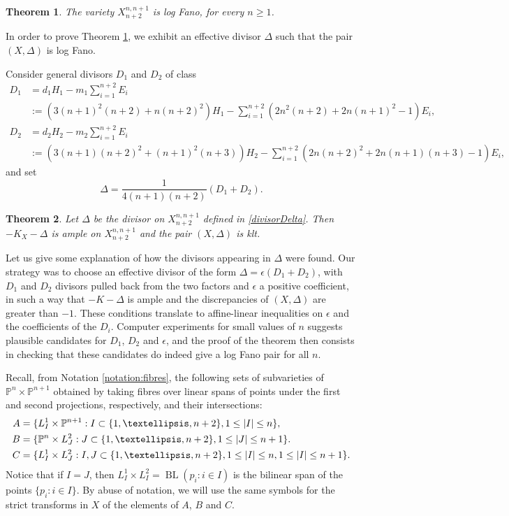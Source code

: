 \documentclass[a4paper,11pt]{article}
\newtheorem{theorem}{Theorem}[section]
\newcommand{\PP}{\mathbb P}
\newcommand{\BL}{\operatorname{BL}}
\begin{document}
\begin{theorem}\label{theoremXn,n+1,n+2-logFano}
The variety $X^{n,n+1}_{n+2}$ is log Fano, for every $n\ge1$.
\end{theorem}
 In order to prove Theorem \ref{theoremXn,n+1,n+2-logFano}, we exhibit an effective divisor $\Delta$ such that the pair $(X,\Delta)$ is log Fano.

Consider general divisors $D_1$ and $D_2$ of class
\begin{align*}
D_1&=d_1H_1-m_1\sum_{i=1}^{n+2}E_i\\
&:= \left(3(n+1)^2(n+2)+n(n+2)^2 \right)H_1-\sum_{i=1}^{n+2} \left( 2n^2(n+2)+2n(n+1)^2-1 \right)E_i,\\
D_2&=d_2H_2-m_2\sum_{i=1}^{n+2}E_i\\
&:=\left(3(n+1)(n+2)^2+(n+1)^2(n+3)\right)H_2-\sum_{i=1}^{n+2} \left(2n(n+2)^2+2n(n+1)(n+3)-1 \right)E_i,
\end{align*} 
and set
\begin{equation}\label{divisorDelta}
\Delta=\frac{1}{4(n+1)(n+2)}(D_1+D_2).
\end{equation}

\begin{theorem}\label{theoremXn,n+1,n+2-logFanoexplicit}
Let $\Delta$ be the divisor on $X^{n,n+1}_{n+2}$ defined  
in \eqref{divisorDelta}. Then  $-K_X-\Delta$ is ample on $X^{n,n+1}_{n+2}$ and the pair $(X,\Delta)$ is klt.
\end{theorem}
 Let us give some explanation of how the divisors appearing in $\Delta$ were found. Our strategy was to choose an effective divisor of the form $\Delta=\epsilon \left(D_1+D_2\right)$, with $D_1$ and $D_2$ divisors pulled back from the two factors and $\epsilon$ a positive coefficient, in such a way that $-K-\Delta$ is ample and the discrepancies of $(X,\Delta)$ are greater than $-1$. These conditions translate to affine-linear inequalities on $\epsilon$ and the coefficients of the $D_i$. Computer experiments for small values of $n$ suggests plausible candidates for $D_1$, $D_2$ and $\epsilon$, and the proof of the theorem then consists in checking that these candidates do indeed give a log Fano pair for all $n$.

Recall, from  Notation \ref{notation:fibres}, the following sets of subvarieties of $\PP^n\times\PP^{n+1}$ obtained by taking fibres over  linear spans of points under the first and second projections, respectively, and their intersections:
\begin{align}\label{notation:ABC}
A&=\{L^1_I\times\PP^{n+1}: I\subset\{1,\dots,n+2\},1\le |I|\le n\},\notag\\
B&=\{\PP^{n}\times L^2_J: J\subset\{1,\dots,n+2\}, 1\le |J|\le n+1\}.\\
C&=\{L^1_I\times L^2_J: I,J\subset\{1,\dots,n+2\},1\le |I|\le n,  1\le |I|\le n+1\}.\notag
\end{align}
Notice that if $I=J$, then $L^1_I\times L^2_I=\BL(p_i:i\in I)$ is the bilinear span of the points $\{p_i:i\in I\}$.
%
By abuse of notation, we will use the same symbols for the strict transforms in $X$ of the elements of $A$, $B$ and $C$.
\end{document}
